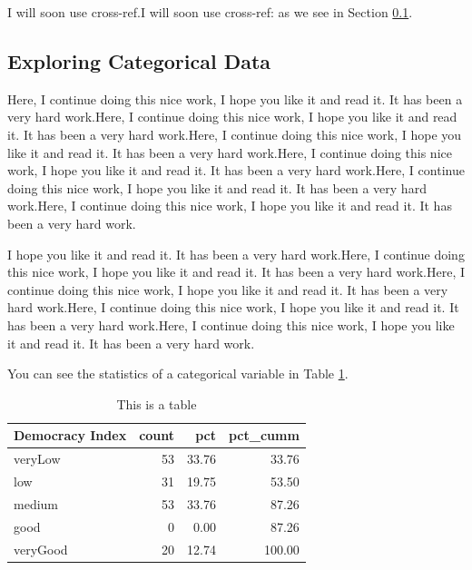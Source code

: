 \documentclass[11pt]{article}
\begin{document}
I will soon use cross-ref.I will soon use cross-ref: as we see in Section \ref{catexplor}.



\subsection{Exploring Categorical Data}\label{catexplor}

Here, I continue doing this nice work, I hope you like it and read it. It has been a very hard work.Here, I continue doing this nice work, I hope you like it and read it. It has been a very hard work.Here, I continue doing this nice work, I hope you like it and read it. It has been a very hard work.Here, I continue doing this nice work, I hope you like it and read it. It has been a very hard work.Here, I continue doing this nice work, I hope you like it and read it. It has been a very hard work.Here, I continue doing this nice work, I hope you like it and read it. It has been a very hard work.

I hope you like it and read it. It has been a very hard work.Here, I continue doing this nice work, I hope you like it and read it. It has been a very hard work.Here, I continue doing this nice work, I hope you like it and read it. It has been a very hard work.Here, I continue doing this nice work, I hope you like it and read it. It has been a very hard work.Here, I continue doing this nice work, I hope you like it and read it. It has been a very hard work.

You can see the statistics of a categorical variable in Table \ref{catexploreTable}.


\begin{table}

\caption{This is a table\label{catexploreTable}}
\centering
\begin{tabular}[t]{l|r|r|r}
\hline
Democracy Index & count & pct & pct\_cumm\\
\hline
veryLow & 53 & 33.76 & 33.76\\
\hline
low & 31 & 19.75 & 53.50\\
\hline
medium & 53 & 33.76 & 87.26\\
\hline
good & 0 & 0.00 & 87.26\\
\hline
veryGood & 20 & 12.74 & 100.00\\
\hline
\end{tabular}
\end{table}
\end{document}
